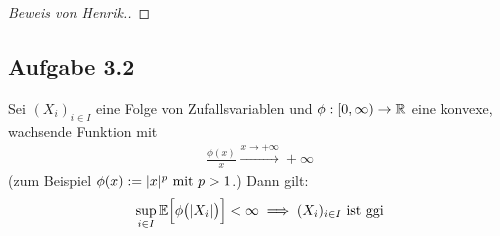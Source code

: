 \begin{proof}[Beweis von Henrik.]

\end{proof}

\subsection{Aufgabe 3.2}
Sei $(X_i)_{i\in I}$ eine Folge von Zufallsvariablen und $\phi:[0,\infty)\to\R$ eine konvexe, wachsende Funktion mit 
\begin{align*}
	\frac{\phi(x)}{x}\stackrel{x\to+\infty}{\longrightarrow}+\infty
\end{align*}
(zum Beispiel $\phi(x):=|x|^p\mit p>1$.) Dann gilt:
\begin{align*}
	\sup\limits_{i\in I}\E\Big[\phi\big(|X_i|\big)\Big]<\infty\implies(X_i)_{i\in I}\text{ ist ggi}
\end{align*}

